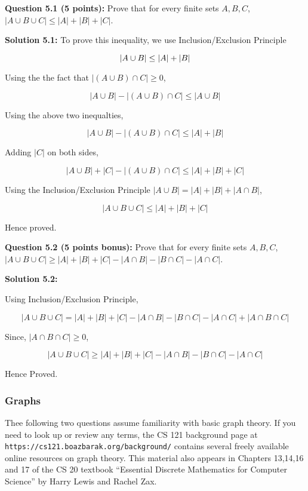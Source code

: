 \documentclass[11pt]{article}
\begin{document}
\textbf{Question 5.1 (5 points):} Prove that for every finite sets
\(A,B,C\), \(|A \cup B \cup C| \leq |A|+|B|+|C|\).

\textbf{Solution 5.1:} 
To prove this inequality, we use Inclusion/Exclusion Principle

$$
|A \cup B| \le |A| + |B|\\
$$

Using the the fact that $|(A \cup B) \cap C| \ge 0$,

$$
|A \cup B| - |(A \cup B) \cap C| \le |A \cup B|
$$

Using the above two inequalties,

$$
|A \cup B| - |(A \cup B) \cap C| \le |A| + |B|
$$

Adding $|C|$ on both sides,

$$
|A \cup B| + |C| - |(A \cup B) \cap C| \le |A| + |B| + |C|
$$

Using the Inclusion/Exclusion Principle $|A \cup B| = |A| + |B| + |A \cap B|$,

$$
|A \cup B \cup C| \le |A| + |B| + |C|
$$

Hence proved.

\textbf{Question 5.2 (5 points bonus):} Prove that for every finite sets
\(A,B,C\),
\(|A \cup B \cup C| \geq |A|+|B|+|C| - |A \cap B| - |B \cap C| - |A \cap C|\).

\textbf{Solution 5.2:}

Using Inclusion/Exclusion Principle,

$$
|A \cup B \cup C| = |A| + |B| + |C| - |A \cap B| - |B \cap C| - |A \cap C|
+ |A \cap B \cap C|
$$

Since, $|A \cap B \cap C| \ge 0$,

$$
|A \cup B \cup C| \ge |A| + |B| + |C| - |A \cap B| - |B \cap C| - |A \cap C|
$$

Hence Proved.

\subsubsection{Graphs}\label{graphs}

Thee following two questions assume familiarity with basic graph theory.
If you need to look up or review any terms, the CS 121 background page at
{\tt https://cs121.boazbarak.org/background/}
contains several freely available online resources on graph theory. This
material also appears in Chapters 13,14,16 and 17 of the CS 20 textbook
``Essential Discrete Mathematics for Computer Science'' by Harry Lewis
and Rachel Zax.
\end{document}

